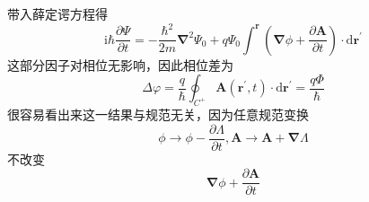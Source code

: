 \documentclass[12pt, a4paper, oneside]{ctexart}
\begin{document}
	\quad\quad 带入薛定谔方程得
	\begin{equation}
		\mathrm{i}\hbar\dfrac{\partial\Psi}{\partial t}=-\dfrac{\hbar^{2}}{2m}\boldsymbol{\nabla}^{2}\Psi_{0}+q\Psi_{0}\int^{\boldsymbol{r}}\left(\boldsymbol{\nabla}\phi+\dfrac{\partial\boldsymbol{A}}{\partial t}\right)\cdot\mathrm{d}\boldsymbol{r^{\prime}}
	\end{equation}
	\quad\quad 这部分因子对相位无影响，因此相位差为
	\begin{equation}
		\Delta\varphi=\dfrac{q}{\hbar}\oint_{C^{+}}\boldsymbol{A}(\boldsymbol{r^{\prime}},t)\cdot\mathrm{d}\boldsymbol{r^{\prime}}=\dfrac{q\Phi}{\hbar}
	\end{equation}
	\quad\quad 很容易看出来这一结果与规范无关，因为任意规范变换
	\begin{equation}
		\phi\to\phi-\dfrac{\partial\Lambda}{\partial t},\boldsymbol{A}\to\boldsymbol{A}+\boldsymbol{\nabla}\Lambda
	\end{equation}
	\quad\quad 不改变
	\begin{equation}
		\boldsymbol{\nabla}\phi+\dfrac{\partial\boldsymbol{A}}{\partial t}
	\end{equation}
\end{document}
